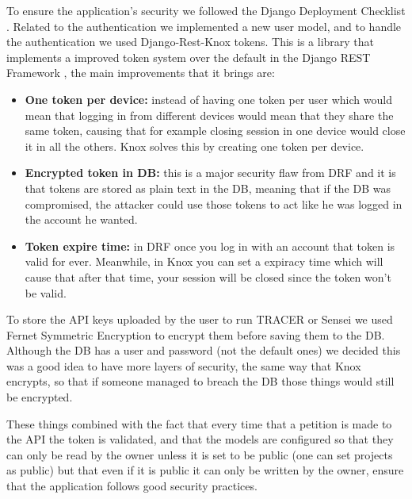 To ensure the application's security we followed the Django Deployment Checklist \autocite{DeploymentChecklistDjango}.
Related to the authentication we implemented a new user model,
and to handle the authentication we used Django-Rest-Knox \autocite{DjangoRestKnox} tokens.
This is a library that implements a improved token system over the default in the Django REST Framework \autocite{DjangoRESTFramework},
the main improvements that it brings are:
\begin{itemize}
  \item \textbf{One token per device:}
    instead of having one token per user
    which would mean that logging in from different devices
    would mean that they share the same token,
    causing that for example closing session in one device would close it in all the others.
    Knox solves this by creating one token per device.

  \item \textbf{Encrypted token in \ac{DB}:}
    this is a major security flaw from \ac{DRF}
    and it is that tokens are stored as plain text in the \ac{DB},
    meaning that if the \ac{DB} was compromised,
    the attacker could use those tokens to act like he was logged in the account he wanted.

  \item \textbf{Token expire time:}
    in \ac{DRF} once you log in with an account that token is valid for ever.
    Meanwhile, in Knox you can set a expiracy time which will cause that after that time,
    your session will be closed since the token won't be valid.
\end{itemize}

To store the \ac{API} keys uploaded by the user to run \ac{TRACER} or Sensei
we used Fernet Symmetric Encryption \autocite{FernetSymmetricEncryption}
to encrypt them before saving them to the \ac{DB}.
Although the \ac{DB} has a user and password (not the default ones)
we decided this was a good idea to have more layers of security,
the same way that Knox encrypts, so that if someone managed to breach the \ac{DB}
those things would still be encrypted.

These things combined with the fact that
every time that a petition is made to the \ac{API} the token is validated,
and that the models are configured so that they can only be
read by the owner unless it is set to be public (one can set projects as public)
but that even if it is public it can only be written by the owner,
ensure that the application follows good security practices.
